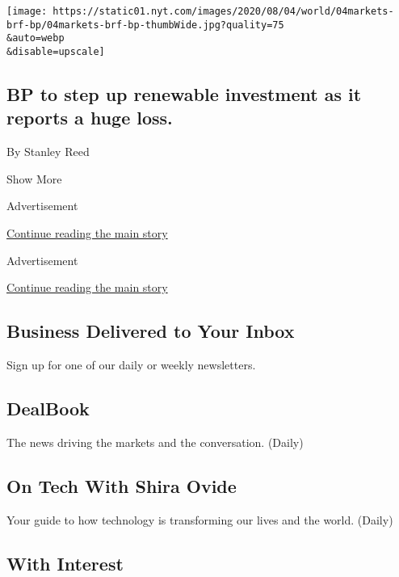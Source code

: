 \begin{enumerate}
  \texttt{[image: https://static01.nyt.com/images/2020/08/04/world/04markets-brf-bp/04markets-brf-bp-thumbWide.jpg?quality=75\\\&auto=webp\\\&disable=upscale]}

  \hypertarget{bp-to-step-up-renewable-investment-as-it-reports-a-huge-loss}{%
  \subsection{BP to step up renewable investment as it reports a huge
  loss.}\label{bp-to-step-up-renewable-investment-as-it-reports-a-huge-loss}}

  By Stanley Reed
\end{enumerate}

Show More

Advertisement

\protect\hyperlink{after-mid2}{Continue reading the main story}

Advertisement

\protect\hyperlink{after-mktg}{Continue reading the main story}

\hypertarget{business-delivered-to-your-inbox}{%
\subsection{Business Delivered to Your
Inbox}\label{business-delivered-to-your-inbox}}

Sign up for one of our daily or weekly newsletters.

\hypertarget{dealbook}{%
\subsection{DealBook}\label{dealbook}}

The news driving the markets and the conversation. (Daily)

\hypertarget{on-tech-with-shira-ovide}{%
\subsection{On Tech With Shira Ovide}\label{on-tech-with-shira-ovide}}

Your guide to how technology is transforming our lives and the world.
(Daily)

\hypertarget{with-interest}{%
\subsection{With Interest}\label{with-interest}}

